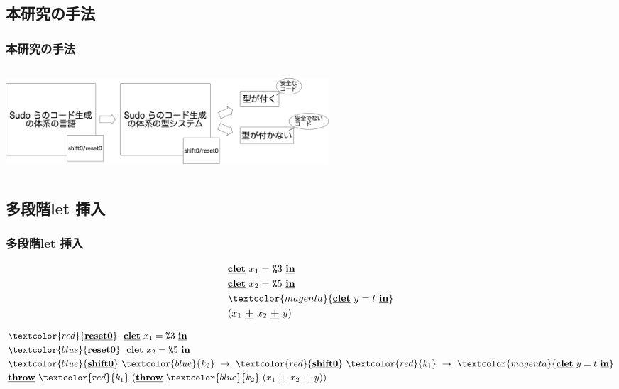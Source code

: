 \documentclass[dvipdfmx,cjk,xcolor=dvipsnames,envcountsect,notheorems,12pt]{beamer}
\newcommand\cResetz{\underline{\textbf{reset0}}}
\newcommand\cShiftz{\underline{\textbf{shift0}}}
\newcommand\cThrow{\underline{\textbf{throw}}}
\newcommand\cPlus{\underline{\textbf{+}}}
\newcommand\cLet{\underline{\textbf{clet}}}
\newcommand\cIn{\underline{\textbf{in}}}
\newcommand\csp[1]{\texttt{\%}{#1}}
\newcommand\red[1]{\textcolor{red}{#1}}
\newcommand\magenta[1]{\textcolor{magenta}{#1}}
\newcommand\blue[1]{\textcolor{blue}{#1}}
\theoremstyle{definition}
\begin{document}


\subsection{本研究の手法}
\begin{frame}
  \frametitle{本研究の手法}
  \begin{columns}
    \begin{column}{1.\textwidth}%
      \center
      \includegraphics[clip,height=3.2cm]{./img/code_s0r0.png}
    \end{column}
  \end{columns}
\end{frame}

\subsection{多段階let 挿入}
\begin{frame}[fragile]
  \frametitle{多段階let 挿入}
  \begin{align*}
    & \cLet~x_1=\csp{3}~\cIn \\
    & \cLet~x_2=\csp{5}~\cIn \\
    & \magenta{\cLet~y=t~\cIn} \\
    & (x_1~\cPlus~x_2~\cPlus~y)
  \end{align*}

  \pause

  \begin{align*}
    & \red{\cResetz} ~~\cLet~x_1=\csp{3}~\cIn \\
    & \blue{\cResetz} ~~\cLet~x_2=\csp{5}~\cIn \\
    & \blue{\cShiftz}~\blue{k_2}~\to~ \red{\cShiftz}~\red{k_1}~\to~ \magenta{\cLet~y=t~\cIn} \\
    & \cThrow~\red{k_1}~(\cThrow~\blue{k_2}~(x_1~\cPlus~x_2~\cPlus~y))
  \end{align*}
\end{frame}
\end{document}
